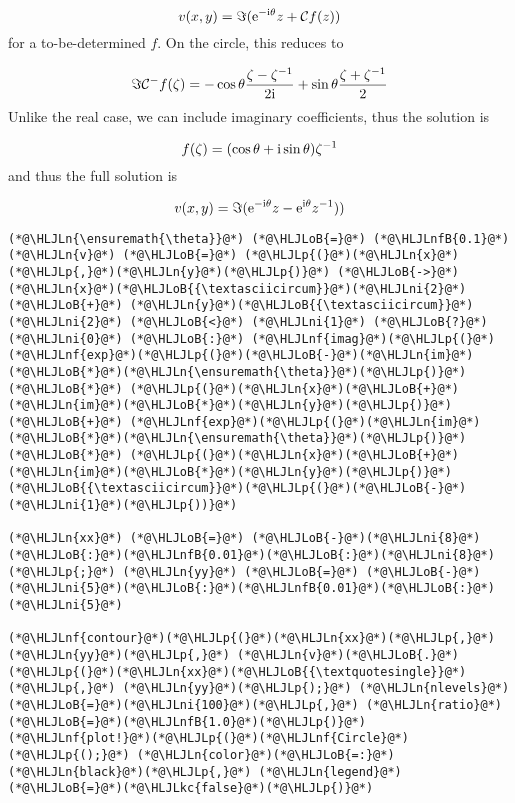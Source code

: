 \documentclass[12pt,landscape]{article}
\newcommand{\HLJLkc}[1]{\textcolor[RGB]{59,151,46}{\textit{#1}}}
\newcommand{\HLJLn}[1]{#1}
\newcommand{\HLJLnf}[1]{\textcolor[RGB]{66,102,213}{#1}}
\newcommand{\HLJLnfB}[1]{\textcolor[RGB]{59,151,46}{#1}}
\newcommand{\HLJLni}[1]{\textcolor[RGB]{59,151,46}{#1}}
\newcommand{\HLJLoB}[1]{\textcolor[RGB]{102,102,102}{\textbf{#1}}}
\newcommand{\HLJLp}[1]{#1}
\def\I{ {\rm i} }
\def\E{ {\rm e} }
\def\CC{ {\cal C} }
\begin{document}
{\[
v(x,y) = \Im ( \E^{-\I \theta} z + \CC f(z))
\]
for a to-be-determined $f$. On the circle, this reduces to

\[
\Im \CC^- f(\zeta) = -\cos \theta {\zeta - \zeta^{-1} \over 2 \I}  + \sin \theta {\zeta + \zeta^{-1} \over 2}
\]
Unlike the real case, we can include imaginary coefficients, thus the solution is

\[
f(\zeta) = (\cos \theta + \I \sin \theta) \zeta^{-1}
\]
and thus the full solution is

\[
v(x,y) =  \Im ( \E^{-\I \theta} z - \E^{\I \theta}   z^{-1}))
\]

\begin{lstlisting}
(*@\HLJLn{\ensuremath{\theta}}@*) (*@\HLJLoB{=}@*) (*@\HLJLnfB{0.1}@*)
(*@\HLJLn{v}@*) (*@\HLJLoB{=}@*) (*@\HLJLp{(}@*)(*@\HLJLn{x}@*)(*@\HLJLp{,}@*)(*@\HLJLn{y}@*)(*@\HLJLp{)}@*) (*@\HLJLoB{->}@*) (*@\HLJLn{x}@*)(*@\HLJLoB{{\textasciicircum}}@*)(*@\HLJLni{2}@*) (*@\HLJLoB{+}@*) (*@\HLJLn{y}@*)(*@\HLJLoB{{\textasciicircum}}@*)(*@\HLJLni{2}@*) (*@\HLJLoB{<}@*) (*@\HLJLni{1}@*) (*@\HLJLoB{?}@*) (*@\HLJLni{0}@*) (*@\HLJLoB{:}@*) (*@\HLJLnf{imag}@*)(*@\HLJLp{(}@*)(*@\HLJLnf{exp}@*)(*@\HLJLp{(}@*)(*@\HLJLoB{-}@*)(*@\HLJLn{im}@*)(*@\HLJLoB{*}@*)(*@\HLJLn{\ensuremath{\theta}}@*)(*@\HLJLp{)}@*) (*@\HLJLoB{*}@*) (*@\HLJLp{(}@*)(*@\HLJLn{x}@*)(*@\HLJLoB{+}@*)(*@\HLJLn{im}@*)(*@\HLJLoB{*}@*)(*@\HLJLn{y}@*)(*@\HLJLp{)}@*) (*@\HLJLoB{+}@*) (*@\HLJLnf{exp}@*)(*@\HLJLp{(}@*)(*@\HLJLn{im}@*)(*@\HLJLoB{*}@*)(*@\HLJLn{\ensuremath{\theta}}@*)(*@\HLJLp{)}@*) (*@\HLJLoB{*}@*) (*@\HLJLp{(}@*)(*@\HLJLn{x}@*)(*@\HLJLoB{+}@*)(*@\HLJLn{im}@*)(*@\HLJLoB{*}@*)(*@\HLJLn{y}@*)(*@\HLJLp{)}@*)(*@\HLJLoB{{\textasciicircum}}@*)(*@\HLJLp{(}@*)(*@\HLJLoB{-}@*)(*@\HLJLni{1}@*)(*@\HLJLp{))}@*)

(*@\HLJLn{xx}@*) (*@\HLJLoB{=}@*) (*@\HLJLoB{-}@*)(*@\HLJLni{8}@*)(*@\HLJLoB{:}@*)(*@\HLJLnfB{0.01}@*)(*@\HLJLoB{:}@*)(*@\HLJLni{8}@*)(*@\HLJLp{;}@*) (*@\HLJLn{yy}@*) (*@\HLJLoB{=}@*) (*@\HLJLoB{-}@*)(*@\HLJLni{5}@*)(*@\HLJLoB{:}@*)(*@\HLJLnfB{0.01}@*)(*@\HLJLoB{:}@*)(*@\HLJLni{5}@*)

(*@\HLJLnf{contour}@*)(*@\HLJLp{(}@*)(*@\HLJLn{xx}@*)(*@\HLJLp{,}@*) (*@\HLJLn{yy}@*)(*@\HLJLp{,}@*) (*@\HLJLn{v}@*)(*@\HLJLoB{.}@*)(*@\HLJLp{(}@*)(*@\HLJLn{xx}@*)(*@\HLJLoB{{\textquotesingle}}@*)(*@\HLJLp{,}@*) (*@\HLJLn{yy}@*)(*@\HLJLp{);}@*) (*@\HLJLn{nlevels}@*)(*@\HLJLoB{=}@*)(*@\HLJLni{100}@*)(*@\HLJLp{,}@*) (*@\HLJLn{ratio}@*)(*@\HLJLoB{=}@*)(*@\HLJLnfB{1.0}@*)(*@\HLJLp{)}@*)
(*@\HLJLnf{plot!}@*)(*@\HLJLp{(}@*)(*@\HLJLnf{Circle}@*)(*@\HLJLp{();}@*) (*@\HLJLn{color}@*)(*@\HLJLoB{=:}@*)(*@\HLJLn{black}@*)(*@\HLJLp{,}@*) (*@\HLJLn{legend}@*)(*@\HLJLoB{=}@*)(*@\HLJLkc{false}@*)(*@\HLJLp{)}@*)
\end{lstlisting}

}
\end{document}
